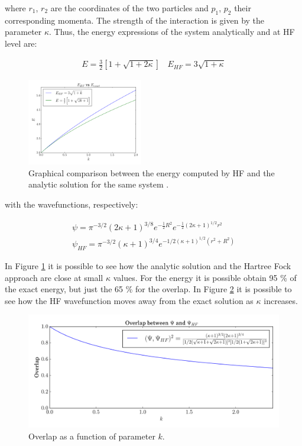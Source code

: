 \noindent where $r_1$, $r_2$ are the coordinates of the two particles and
$p_1$, $p_2$ their corresponding momenta. The strength of the interaction is
given by the parameter $\kappa$. Thus, the energy expressions of the system
analytically and at HF level are:

\begin{align}
  E= \frac32 \left[ 1 + \sqrt{1+2\kappa}\right] \ \ \ \
  E_{HF} = 3\sqrt{1+\kappa}
\end{align}

\begin{figure}
    \centering
    \includegraphics[width=0.45\textwidth]{3/img/HF_vs_excat}
    \caption{Graphical comparison between the energy computed by HF and the analytic solution
    for the same system \cite{Moshinsky}.}
\label{HF_vs_excat}
\end{figure}

\noindent with the wavefunctions, respectively:

\begin{align}
  \psi = \pi^{-3/2} (2\kappa +1)^{3/8} e^{-\frac12 R^2} e^{-\frac12(2\kappa+1)^{1/2}r^2} \\\nonumber
  \psi_{HF} = \pi^{-3/2}(\kappa +1)^{3/4} e^{-1/2(\kappa +1)^{1/2}(r^2+R^2)}
\end{align}

In Figure \ref{HF_vs_excat} it is possible to see how the analytic solution and
the Hartree Fock approach are close at small $\kappa$ values. For the energy it
is possible obtain 95 \% of the exact energy, but just the 65 \% for the
overlap. In Figure \ref{HF_vs_psi} it is possible to see how the HF
wavefunction moves away from the exact solution as $\kappa$ increases.


\begin{figure}
  \centering
  \includegraphics[width=1\textwidth]{3/img/HF_vs_psi.pdf}
  \caption{Overlap as a function of parameter $k$.}
\label{HF_vs_psi}
\end{figure}

